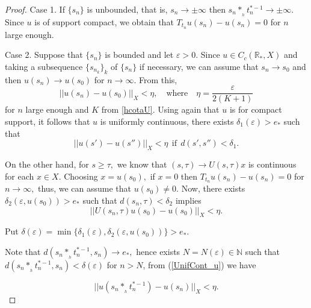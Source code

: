\documentclass[10pt,a4paper]{amsart}
\begin{document}
\begin{proof}
\medskip

Case 1. If $\{s_n\}$ is unbounded, that is, $s_n \to \pm \infty$ then $s_n*_{_h} t_n^{*-1} \to \pm \infty.$ Since $u$ is of support compact, we obtain that  $T_{t_n}u(s_n) - u(s_n) = 0$ for $n$ large enough.

\medskip

Case 2. Suppose that $\{s_n\}$ is bounded and let $\varepsilon > 0.$ Since $u \in C_c(\mathbb{R}_*, X)$ and taking a subsequence $\{s_{n_k}\}_k$ of  $\{s_n\}$   if necessary, we can assume that $s_n \to s_0$ and then $u(s_n) \to u(s_0)$ for $n \to \infty.$ From this, 
\begin{equation}\label{cont_u}
||u(s_n) - u(s_0)||_X < \eta, \quad \mbox{where} \quad \eta  = \frac{\varepsilon}{2(K + 1)}
\end{equation}
for $n$ large enough and $K$ from \eqref{hcotaU}. Using again that $u$ is for compact support, it follows that $u$ is uniformly continuous, there exists $\delta_1(\varepsilon) > e_*$ such that 
\begin{equation}\label{UnifCont_u}
||u(s') - u(s'')||_X < \eta \ \ \mbox{if} \ \ d(s',s'') < \delta_1.
\end{equation}


\medskip

On the other hand, for $s \ge \tau,$  we know that $(s,\tau) \to U(s,\tau)x$ is continuous for each $x \in X.$ Choosing $x = u(s_0),$ if $x = 0$ then $T_{t_n}u(s_n) - u(s_n) = 0$ for $n \to \infty,$ thus, we can assume that $u(s_0) \ne 0.$ Now,  there exists $\delta_2(\varepsilon, u(s_0)) > e_*$ such that $d(s_n,\tau) < \delta_2$ implies
\begin{equation}\label{Cont_U}
||U(s_n, \tau) u(s_0) - u(s_0)||_X < \eta.
\end{equation}


Put $\delta(\varepsilon) = \min\{ \delta_1(\varepsilon), \delta_2(\varepsilon, u(s_0))\}  > e_*.$

\medskip

\noindent Note that  $d(s_n*_{_h}t_n^{*-1}, s_n) \to e_*,$ hence exists $N = N(\varepsilon) \in \mathbb{N}$ such that $d(s_n*_{_h}t_n^{*-1}, s_n) < \delta(\varepsilon)$ for $n > N$,
from (\ref{UnifCont_u})  we have

\begin{equation}\label{cota_u_n}
||u(s_n*_{_h}t_n^{*-1}) - u(s_n)||_X < \eta.
\end{equation}



\end{proof}
\end{document}
